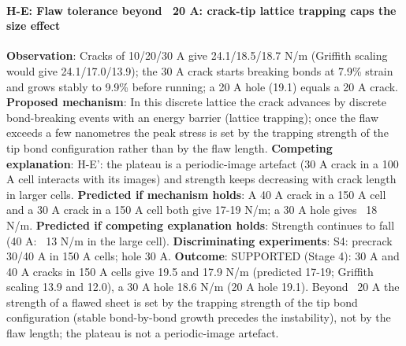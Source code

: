 \paragraph{H-E: Flaw tolerance beyond ~20 A: crack-tip lattice trapping caps the size effect} \textbf{Observation}: Cracks of 10/20/30 A give 24.1/18.5/18.7 N/m (Griffith scaling would give 24.1/17.0/13.9); the 30 A crack starts breaking bonds at 7.9\% strain and grows stably to 9.9\% before running; a 20 A hole (19.1) equals a 20 A crack. \textbf{Proposed mechanism}: In this discrete lattice the crack advances by discrete bond-breaking events with an energy barrier (lattice trapping); once the flaw exceeds a few nanometres the peak stress is set by the trapping strength of the tip bond configuration rather than by the flaw length. \textbf{Competing explanation}: H-E': the plateau is a periodic-image artefact (30 A crack in a 100 A cell interacts with its images) and strength keeps decreasing with crack length in larger cells. \textbf{Predicted if mechanism holds}: A 40 A crack in a 150 A cell and a 30 A crack in a 150 A cell both give 17-19 N/m; a 30 A hole gives ~18 N/m. \textbf{Predicted if competing explanation holds}: Strength continues to fall (40 A: ~13 N/m in the large cell). \textbf{Discriminating experiments}: S4: precrack 30/40 A in 150 A cells; hole 30 A. \textbf{Outcome}: SUPPORTED (Stage 4): 30 A and 40 A cracks in 150 A cells give 19.5 and 17.9 N/m (predicted 17-19; Griffith scaling 13.9 and 12.0), a 30 A hole 18.6 N/m (20 A hole 19.1). Beyond ~20 A the strength of a flawed sheet is set by the trapping strength of the tip bond configuration (stable bond-by-bond growth precedes the instability), not by the flaw length; the plateau is not a periodic-image artefact.

